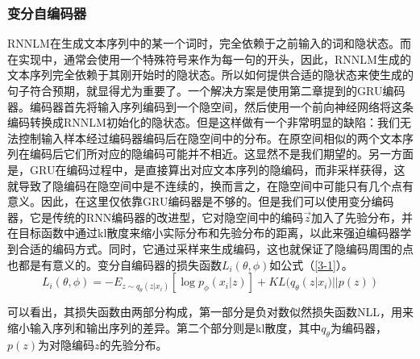 \documentclass[]{template}
\begin{document}
\subsubsection{变分自编码器}
RNNLM在生成文本序列中的某一个词时，完全依赖于之前输入的词和隐状态。而在实现中，通常会使用一个特殊符号来作为每一句的开头，因此，RNNLM生成的文本序列完全依赖于其刚开始时的隐状态。所以如何提供合适的隐状态来使生成的句子符合预期，就显得尤为重要了。一个解决方案是使用第二章提到的GRU编码器。编码器首先将输入序列编码到一个隐空间，然后使用一个前向神经网络将这条编码转换成RNNLM初始化的隐状态。但是这样做有一个非常明显的缺陷：我们无法控制输入样本经过编码器编码后在隐空间中的分布。在原空间相似的两个文本序列在编码后它们所对应的隐编码可能并不相近。这显然不是我们期望的。另一方面是，GRU在编码过程中，是直接算出对应文本序列的隐编码，而非采样获得，这就导致了隐编码在隐空间中是不连续的，换而言之，在隐空间中可能只有几个点有意义。因此，在这里仅依靠GRU编码器是不够的。但是我们可以使用变分编码器，它是传统的RNN编码器的改进型，它对隐空间中的编码\(\overrightarrow{z}\)加入了先验分布，并在目标函数中通过kl散度来缩小实际分布和先验分布的距离，以此来强迫编码器学到合适的编码方式。同时，它通过采样来生成编码，这也就保证了隐编码周围的点也都是有意义的。变分自编码器的损失函数$L_i(\theta,\phi)$如公式（\ref{3-1}）。
\begin{equation}\label{3-1}
    L_i(\theta,\phi)=-E_{z\sim q_\theta(z|x_i)}[\log p_\phi(x_i|z)]+KL (q_\theta(z|x_i)||p(z))
\end{equation}

可以看出，其损失函数由两部分构成，第一部分是负对数似然损失函数NLL，用来缩小输入序列和输出序列的差异。第二个部分则是kl散度，其中$q_\theta$为编码器，$p(z)$为对隐编码$z$的先验分布。
\end{document}
